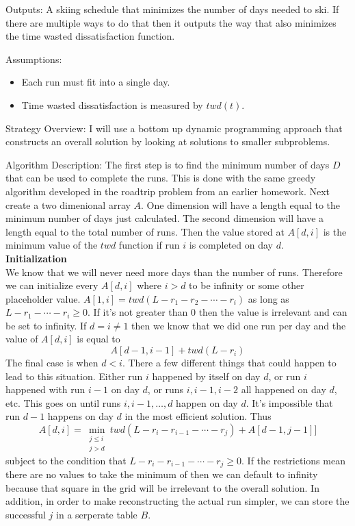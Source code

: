 \documentclass{article}
\begin{document}
Outputs: A skiing schedule that minimizes the number of days needed to ski. If there are multiple ways to do that then it outputs the way that also minimizes the time wasted dissatisfaction function.

Assumptions:
\begin{itemize}
    \item Each run must fit into a single day.
    \item Time wasted dissatisfaction is measured by $twd(t)$. 
\end{itemize}

Strategy Overview:
I will use a bottom up dynamic programming approach that constructs an overall solution by looking at solutions to smaller subproblems.

Algorithm Description:
The first step is to find the minimum number of days $D$ that can be used to complete the runs. This is done with the same greedy algorithm developed in the roadtrip problem from an earlier homework. Next create a two dimenional array $A$. One dimension will have a length equal to the minimum number of days just calculated. The second dimension will have a length equal to the total number of runs. Then the value stored at $A[d, i]$ is the minimum value of the $twd$ function if run $i$ is completed on day $d$. \\

\textbf{Initialization}\\
We know that we will never need more days than the number of runs. Therefore we can initialize every $A[d, i]$ where $i > d$ to be infinity or some other placeholder value. $A[1,i] = twd(L-r_1 - r_2 - \cdots - r_i)$ as long as $L - r_1 - \cdots - r_i \ge 0$. If it's not greater than 0 then the value is irrelevant and can be set to infinity. If $d = i \ne 1$ then we know that we did one run per day and the value of $A[d, i]$ is equal to 
$$A[d-1, i-1] + twd(L - r_i)$$
The final case is when $d < i$. There a few different things that could happen to lead to this situation. Either run $i$ happened by itself on day $d$, or run $i$ happened with run $i-1$ on day $d$, or runs $i, i-1, i-2$ all happened on day $d$, etc. This goes on until runs $i, i-1, \ldots, d$ happen on day $d$. It's impossible that run $d-1$ happens on day $d$ in the most efficient solution. Thus
$$A[d, i] = \min_{\substack{j\le i\\ j > d}} twd(L - r_i - r_{i-1} - \cdots - r_j)+ A[d-1,j-1]]$$
subject to the condition that $L - r_i - r_{i-1} - \cdots - r_j \ge 0$. If the restrictions mean there are no values to take the minimum of then we can default to infinity because that square in the grid will be irrelevant to the overall solution. In addition, in order to make reconstructing the actual run simpler, we can store the successful $j$ in a serperate table $B$. 
\end{document}
